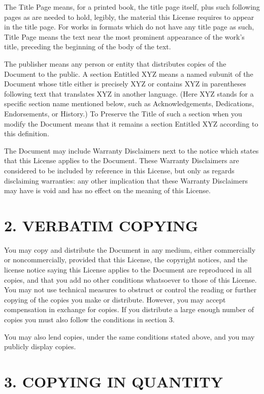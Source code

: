 \documentclass[captions=tableheading]{scrbook}
\begin{document}
The Title Page means, for a printed book, the title page itself, plus such following pages as are needed to hold, legibly, the material this License requires to appear in the title page. For works in formats which do not have any title page as such, Title Page means the text near the most prominent appearance of the work's title, preceding the beginning of the body of the text.

The publisher means any person or entity that distributes copies of the Document to the public.  A section Entitled XYZ means a named subunit of the Document whose title either is precisely XYZ or contains XYZ in parentheses following text that translates XYZ in another language. (Here XYZ stands for a specific section name mentioned below, such as Acknowledgements, Dedications, Endorsements, or History.) To Preserve the Title of such a section when you modify the Document means that it remains a section Entitled XYZ according to this definition.

The Document may include Warranty Disclaimers next to the notice which states that this License applies to the Document. These Warranty Disclaimers are considered to be included by reference in this License, but only as regards disclaiming warranties: any other implication that these Warranty Disclaimers may have is void and has no effect on the meaning of this License.
\section{2. VERBATIM COPYING}
\label{sec-18-3}


You may copy and distribute the Document in any medium, either commercially or noncommercially, provided that this License, the copyright notices, and the license notice saying this License applies to the Document are reproduced in all copies, and that you add no other conditions whatsoever to those of this License. You may not use technical measures to obstruct or control the reading or further copying of the copies you make or distribute. However, you may accept compensation in exchange for copies. If you distribute a large enough number of copies you must also follow the conditions in section 3.

You may also lend copies, under the same conditions stated above, and you may publicly display copies.
\section{3. COPYING IN QUANTITY}
\label{sec-18-4}
\end{document}
